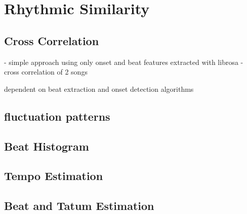 
\chapter{Rhythmic Similarity}\label{rhythmsimc}


\section{Cross Correlation}

- simple approach using only onset and beat features extracted with librosa
- cross correlation of 2 songs

dependent on beat extraction and onset detection algorithms

\section{fluctuation patterns}

\section{Beat Histogram}

\section{Tempo Estimation}

\section{Beat and Tatum Estimation}

